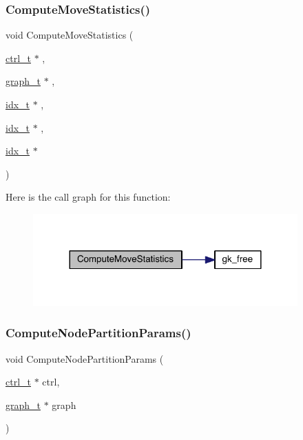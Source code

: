 \mbox{\label{a00951_aed1cff24b99501c84a5ddfc78eae2315}} 
\subsubsection{\texorpdfstring{Compute\+Move\+Statistics()}{ComputeMoveStatistics()}}
{\footnotesize\ttfamily void Compute\+Move\+Statistics (\begin{DoxyParamCaption}\item[{\hyperlink{a00742}{ctrl\+\_\+t} $\ast$}]{,  }\item[{\hyperlink{a00734}{graph\+\_\+t} $\ast$}]{,  }\item[{\hyperlink{a00876_aaa5262be3e700770163401acb0150f52}{idx\+\_\+t} $\ast$}]{,  }\item[{\hyperlink{a00876_aaa5262be3e700770163401acb0150f52}{idx\+\_\+t} $\ast$}]{,  }\item[{\hyperlink{a00876_aaa5262be3e700770163401acb0150f52}{idx\+\_\+t} $\ast$}]{ }\end{DoxyParamCaption})}

Here is the call graph for this function\+:\nopagebreak
\begin{figure}[H]
\begin{center}
\leavevmode
\includegraphics[width=288pt]{a00951_aed1cff24b99501c84a5ddfc78eae2315_cgraph}
\end{center}
\end{figure}
\mbox{\label{a00951_afada4a168b7bda7aeb39f88824363b20}} 
\subsubsection{\texorpdfstring{Compute\+Node\+Partition\+Params()}{ComputeNodePartitionParams()}}
{\footnotesize\ttfamily void Compute\+Node\+Partition\+Params (\begin{DoxyParamCaption}\item[{\hyperlink{a00742}{ctrl\+\_\+t} $\ast$}]{ctrl,  }\item[{\hyperlink{a00734}{graph\+\_\+t} $\ast$}]{graph }\end{DoxyParamCaption})}

